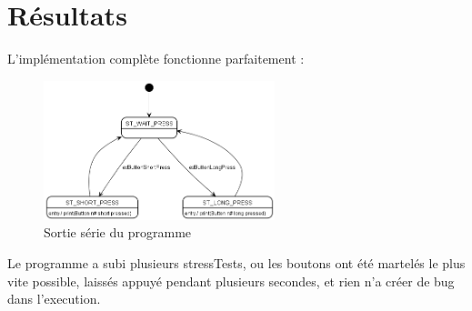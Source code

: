 \section{Résultats}
L'implémentation complète fonctionne parfaitement :
\begin{figure}[H]
    \centering
    \includegraphics[width=0.6\textwidth]{Images/buttons/ButtonEventsLogger.png}
    \caption[Full UML]{Sortie série du programme}
\end{figure}
Le programme a subi plusieurs stressTests, ou les boutons ont été martelés
le plus vite possible, laissés appuyé pendant plusieurs secondes, et rien n'a
créer de bug dans l'execution.